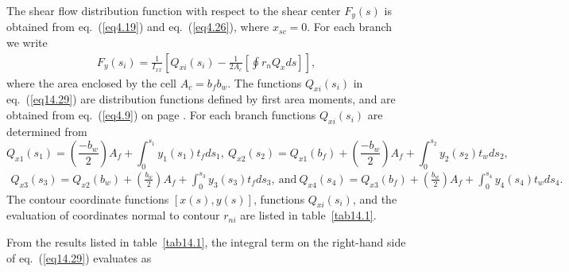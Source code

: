 \documentclass{AeroStructure-ERJohnson}
\begin{document}
The shear flow distribution function with respect to the shear center $F_{y}(s)$ is obtained from eq.~(\ref{eq4.19}) and eq.~(\ref{eq4.26}), where $x_{sc}=0$. For each branch we write
\begin{align}\label{eq14.29}
F_{y}\left(s_{i}\right)=\frac{1}{I_{x x}}\left[Q_{x i}\left(s_{i}\right)-\frac{1}{2 A_{c}}\left[\oint r_{n} Q_{x} d s\right]\right],
\end{align}
where the area enclosed by the cell $A_{c}=b_f b_{w}$. The functions $Q_{x i}\left(s_{i}\right)$ in eq.~(\ref{eq14.29}) are distribution functions defined by first area moments, and are obtained from eq.~(\ref{eq4.9}) on page \pageref{eq4.9}. For each branch functions $Q_{x i}\left(s_{i}\right)$ are determined from
\[Q_{x 1}\left(s_{1}\right)=\left(\frac{-b_{w}}{2}\right) A_{f}+\int_{0}^{s_{1}} y_{1}\left(s_{1}\right) t_{f} d s_{1},\ Q_{x 2}\left(s_{2}\right)=Q_{x 1}\left(b_{f}\right)+\left(\frac{-b_{w}}{2}\right) A_{f}+\int_{0}^{s_2} y_{2}\left(s_{2}\right) t_{w} d s_{2},\]
\begin{align}\label{eq14.30}
Q_{x 3}\left(s_{3}\right)=Q_{x 2}\left(b_{w}\right)+\left(\frac{b_{w}}{2}\right) A_{f}+\int_{0}^{s_{3}} y_{3}\left(s_{3}\right) t_{f} d s_{3},\ \text{and}\ Q_{x 4}\left(s_{4}\right)=Q_{x 3}\left(b_{f}\right)+\left(\frac{b_{w}}{2}\right) A_{f}+\int_{0}^{s_{4}} y_{4}\left(s_{4}\right) t_{w} d s_{4}.
\end{align}
The contour coordinate functions $[x(s), y(s)]$, functions $Q_{x i}\left(s_{i}\right)$, and the evaluation of coordinates normal to contour $r_{n i}$ are listed in table~\ref{tab14.1}.

\noindent From the results listed in table~\ref{tab14.1}, the integral term on the right-hand side of eq.~(\ref{eq14.29}) evaluates as

\begin{table}[!h]
\vspace*{-1pc}
\end{table}
\end{document}
